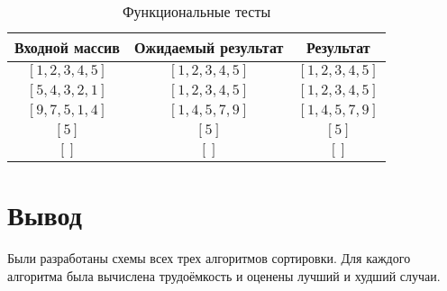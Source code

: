 \begin{table}[h]
	\begin{center}
		\begin{threeparttable}
		\captionsetup{justification=raggedleft,singlelinecheck=off}
		\caption{\label{tbl:functional_test} Функциональные тесты}
		\begin{tabular}{|c|c|c|}
			\hline
			Входной массив & Ожидаемый результат & Результат \\ 
			\hline
			$[1, 2, 3, 4, 5]$ & $[1, 2, 3, 4, 5]$  & $[1, 2, 3, 4, 5]$\\
			$[5, 4, 3, 2, 1]$  & $[1, 2, 3, 4, 5]$ & $[1, 2, 3, 4, 5]$\\
			$[9, 7, 5, 1, 4]$  & $[1, 4, 5, 7, 9]$  & $[1, 4, 5, 7, 9]$\\
			$[5]$  & $[5]$  & $[5]$\\
			$[]$  & $[]$  & $[]$\\
			\hline
		\end{tabular}
    \end{threeparttable}
	\end{center}
\end{table}


\section*{Вывод}

Были разработаны схемы всех трех алгоритмов сортировки. Для каждого алгоритма была вычислена трудоёмкость и оценены лучший и худший случаи.
